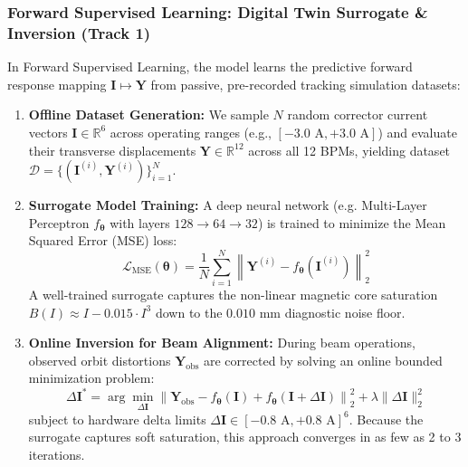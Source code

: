 \documentclass[11pt,a4paper]{article}
\begin{document}
\subsubsection{Forward Supervised Learning: Digital Twin Surrogate \& Inversion (Track 1)}
In Forward Supervised Learning, the model learns the predictive forward response mapping $\mathbf{I} \mapsto \mathbf{Y}$ from passive, pre-recorded tracking simulation datasets:
\begin{enumerate}
    \item \textbf{Offline Dataset Generation:} We sample $N$ random corrector current vectors $\mathbf{I} \in \mathbb{R}^6$ across operating ranges (e.g., $[-3.0\text{ A}, +3.0\text{ A}]$) and evaluate their transverse displacements $\mathbf{Y} \in \mathbb{R}^{12}$ across all 12 BPMs, yielding dataset $\mathcal{D} = \{(\mathbf{I}^{(i)}, \mathbf{Y}^{(i)})\}_{i=1}^N$.
    \item \textbf{Surrogate Model Training:} A deep neural network (e.g. Multi-Layer Perceptron $f_{\boldsymbol{\theta}}$ with layers $128 \rightarrow 64 \rightarrow 32$) is trained to minimize the Mean Squared Error (MSE) loss:
    \begin{equation}
        \mathcal{L}_{\text{MSE}}(\boldsymbol{\theta}) = \frac{1}{N} \sum_{i=1}^N \left\| \mathbf{Y}^{(i)} - f_{\boldsymbol{\theta}}(\mathbf{I}^{(i)}) \right\|_2^2
    \end{equation}
    A well-trained surrogate captures the non-linear magnetic core saturation $B(I) \approx I - 0.015 \cdot I^3$ down to the $0.010\text{ mm}$ diagnostic noise floor.
    \item \textbf{Online Inversion for Beam Alignment:} During beam operations, observed orbit distortions $\mathbf{Y}_{\text{obs}}$ are corrected by solving an online bounded minimization problem:
    \begin{equation}
        \Delta \mathbf{I}^* = \arg\min_{\Delta \mathbf{I}} \left\| \mathbf{Y}_{\text{obs}} - f_{\boldsymbol{\theta}}(\mathbf{I}) + f_{\boldsymbol{\theta}}(\mathbf{I} + \Delta \mathbf{I}) \right\|_2^2 + \lambda \|\Delta \mathbf{I}\|_2^2
    \end{equation}
    subject to hardware delta limits $\Delta \mathbf{I} \in [-0.8\text{ A}, +0.8\text{ A}]^6$. Because the surrogate captures soft saturation, this approach converges in as few as 2 to 3 iterations.
\end{enumerate}
\end{document}
